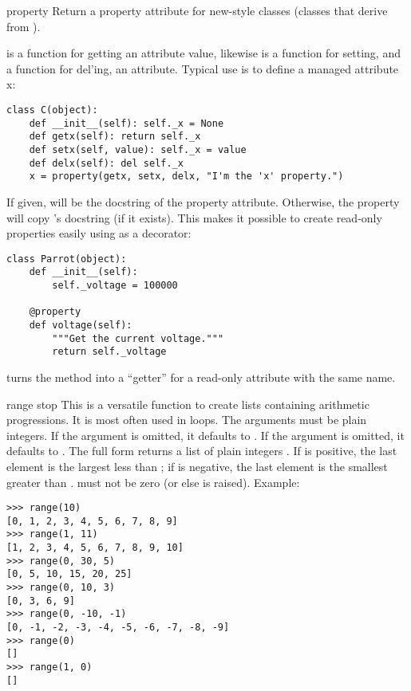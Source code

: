 \begin{funcdesc}{property}{}
  Return a property attribute for new-style classes (classes that
  derive from ).

   is a function for getting an attribute value, likewise
   is a function for setting, and  a function
  for del'ing, an attribute.  Typical use is to define a managed attribute x:

\begin{verbatim}
class C(object):
    def __init__(self): self._x = None
    def getx(self): return self._x
    def setx(self, value): self._x = value
    def delx(self): del self._x
    x = property(getx, setx, delx, "I'm the 'x' property.")
\end{verbatim}

  If given,  will be the docstring of the property attribute.
  Otherwise, the property will copy 's docstring (if it
  exists).  This makes it possible to create read-only properties
  easily using  as a decorator:

\begin{verbatim}
class Parrot(object):
    def __init__(self):
        self._voltage = 100000

    @property
    def voltage(self):
        """Get the current voltage."""
        return self._voltage
\end{verbatim}

  turns the  method into a ``getter'' for a read-only
  attribute with the same name.

\end{funcdesc}

\begin{funcdesc}{range}{ stop}
  This is a versatile function to create lists containing arithmetic
  progressions.  It is most often used in  loops.  The
  arguments must be plain integers.  If the  argument is
  omitted, it defaults to .  If the  argument is
  omitted, it defaults to .  The full form returns a list of
  plain integers .  If  is positive,
  the last element is the largest  less than ; if  is negative, the last
  element is the smallest 
  greater than .   must not be zero (or else
   is raised).  Example:

\begin{verbatim}
>>> range(10)
[0, 1, 2, 3, 4, 5, 6, 7, 8, 9]
>>> range(1, 11)
[1, 2, 3, 4, 5, 6, 7, 8, 9, 10]
>>> range(0, 30, 5)
[0, 5, 10, 15, 20, 25]
>>> range(0, 10, 3)
[0, 3, 6, 9]
>>> range(0, -10, -1)
[0, -1, -2, -3, -4, -5, -6, -7, -8, -9]
>>> range(0)
[]
>>> range(1, 0)
[]
\end{verbatim}
\end{funcdesc}

